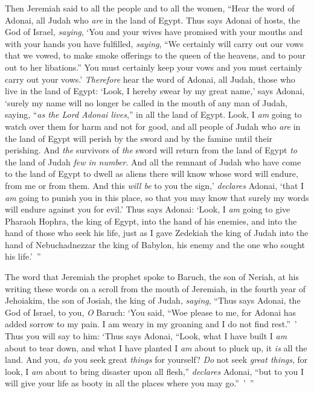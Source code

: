 \begin{biblechapter}
\verse Then Jeremiah said to all the people and to all the women, “Hear the word of Adonai, all Judah who \textit{are} in the land of Egypt.
\verse Thus says Adonai of hosts, the God of Israel, \textit{saying}, ‘You and your wives have promised with your mouths and with your hands you have fulfilled, \textit{saying}, “We certainly will carry out our vows that we vowed, to make smoke offerings to the queen of the heavens, and to pour out to her libations.” You must certainly keep your vows and you must certainly carry out your vows.’
\verse \textit{Therefore} hear the word of Adonai, all Judah, those who live in the land of Egypt: ‘Look, I hereby swear by my great name,’ says Adonai, ‘surely my name will no longer be called in the mouth of any man of Judah, saying, “\textit{as the Lord Adonai lives},” in all the land of Egypt.
\verse Look, I \textit{am} going to watch over them for harm and not for good, and all people of Judah who \textit{are} in the land of Egypt will perish by the sword and by the famine until their perishing.
\verse And \textit{the} survivors of \textit{the} sword will return from the land of Egypt \textit{to} the land of Judah \textit{few in number}. And all the remnant of Judah who have come to the land of Egypt to dwell as aliens there will know whose word will endure, from me or from them.
\verse And this \textit{will be} to you the sign,’ \textit{declares} Adonai, ‘that I \textit{am} going to punish you in this place, so that you may know that surely my words will endure against you for evil.’
\verse Thus says Adonai: ‘Look, I \textit{am} going to give Pharaoh Hophra, the king of Egypt, into the hand of his enemies, and into the hand of those who seek his life, just as I gave Zedekiah the king of Judah into the hand of Nebuchadnezzar the king of Babylon, his enemy and the one who sought his life.’ ”
\end{biblechapter}

\begin{biblechapter} %
 The word that Jeremiah the prophet spoke to Baruch, the son of Neriah, at his writing these words on a scroll from the mouth of Jeremiah, in the fourth year of Jehoiakim, the son of Josiah, the king of Judah, \textit{saying},
\verse “Thus says Adonai, the God of Israel, to you, \textit{O} Baruch:
\verse ‘You said, “Woe please to me, for Adonai has added sorrow to my pain. I am weary in my groaning and I do not find rest.” ’
\verse Thus you will say to him: ‘Thus says Adonai, “Look, what I have built I \textit{am} about to tear down, and what I have planted I \textit{am} about to pluck up, it \textit{is} all the land.
\verse And you, \textit{do} you seek great \textit{things} for yourself? \textit{Do} not seek \textit{great things}, for look, I \textit{am} about to bring disaster upon all flesh,” \textit{declares} Adonai, “but to you I will give your life as booty in all the places where you may go.” ’ ”
\end{biblechapter}

